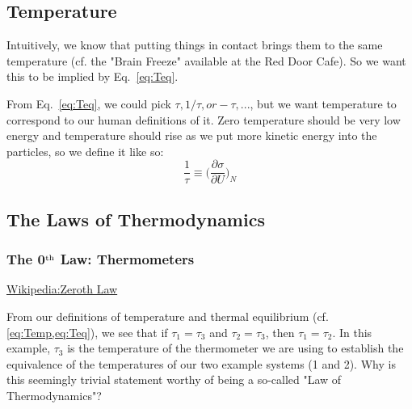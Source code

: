 \subsection{Temperature}
\label{s:Temperature}

Intuitively, we know that putting things in contact brings them to the same temperature
(cf. the "Brain Freeze" available at the Red Door Cafe). So we want this to be
implied by Eq.~\ref{eq:Teq}.

From Eq.~\ref{eq:Teq}, we could pick $\tau, 1/\tau, or -\tau,...$, but we want temperature
to correspond to our human definitions of it. Zero temperature should be very low energy
and temperature should rise as we put more kinetic energy into the particles, so we define
it like so:
\begin{equation}
\frac{1}{\tau} \equiv \bigg(\frac{\partial \sigma}{\partial U}\bigg)_{N}
\label{eq:Temp}
\end{equation}

\newpage
\subsection{The Laws of Thermodynamics}

\subsubsection{The 0$^{\rm th}$ Law: Thermometers}
\href{http://en.wikipedia.org/wiki/Zeroth_law_of_thermodynamics}{Wikipedia:Zeroth Law}

From our definitions of temperature and thermal equilibrium 
(cf. \cref{eq:Temp,eq:Teq}), 
we see that if $\tau_1 = \tau_3$ and $\tau_2 = \tau_3$, then 
$\tau_1 = \tau_2$. 
In this example, $\tau_3$ is the temperature of the thermometer we are 
using to establish the equivalence of the temperatures of our two example 
systems (1 and 2). Why is this seemingly trivial statement worthy
of being a so-called "Law of Thermodynamics"? 



